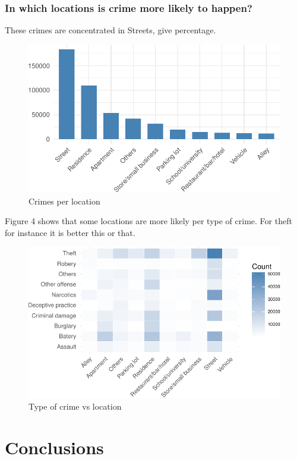 \documentclass[]{article}
\begin{document}
\subsubsection{In which locations is crime more likely to
happen?}\label{in-which-locations-is-crime-more-likely-to-happen}

These crimes are concentrated in Streets, give percentage.

\begin{figure}[H]

{\centering \includegraphics{Assessment_1v12_files/figure-latex/fig7-1} 

}

\caption{Crimes per location}\label{fig:fig7}
\end{figure}

Figure 4 shows that some locations are more likely per type of crime.
For theft for instance it is better this or that.

\begin{figure}[H]

{\centering \includegraphics{Assessment_1v12_files/figure-latex/fig11-1} 

}

\caption{Type of crime vs location}\label{fig:fig11}
\end{figure}

\section{Conclusions}\label{conclusions}
\end{document}
